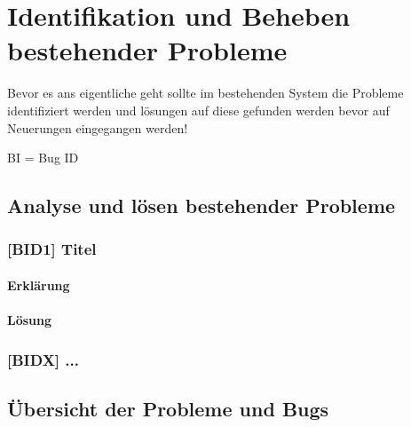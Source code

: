 
\chapter{Identifikation und Beheben bestehender Probleme}
\label{chapter:4}

Bevor es ans eigentliche geht sollte im bestehenden System die Probleme identifiziert werden und lösungen auf diese gefunden werden bevor auf Neuerungen eingegangen werden!




BI = Bug ID

\section{Analyse und lösen bestehender Probleme}

\subsection{[BID1] Titel}

\subsubsection{Erklärung}

\subsubsection{Lösung}

\subsection{[BIDX] ...}

\section{Übersicht der Probleme und Bugs}

